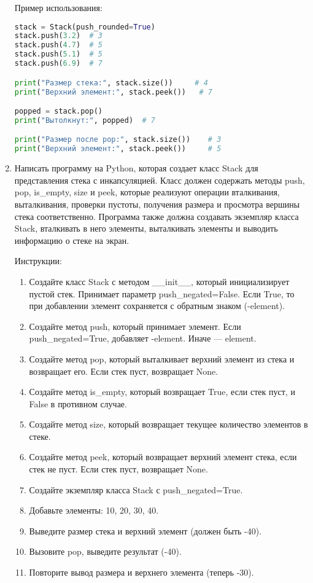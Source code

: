 \begin{enumerate}
Пример использования:
\begin{lstlisting}[language=Python]
stack = Stack(push_rounded=True)
stack.push(3.2)  # 3
stack.push(4.7)  # 5
stack.push(5.1)  # 5
stack.push(6.9)  # 7

print("Размер стека:", stack.size())     # 4
print("Верхний элемент:", stack.peek())   # 7

popped = stack.pop()
print("Вытолкнут:", popped)  # 7

print("Размер после pop:", stack.size())    # 3
print("Верхний элемент:", stack.peek())     # 5
\end{lstlisting}

\item Написать программу на Python, которая создает класс Stack для представления стека с инкапсуляцией. Класс должен содержать методы push, pop, is\_empty, size и peek, которые реализуют операции вталкивания, выталкивания, проверки пустоты, получения размера и просмотра вершины стека соответственно. Программа также должна создавать экземпляр класса Stack, вталкивать в него элементы, выталкивать элементы и выводить информацию о стеке на экран.

Инструкции:
\begin{enumerate}
    \item Создайте класс Stack с методом \_\_init\_\_, который инициализирует пустой стек. Принимает параметр push\_negated=False. Если True, то при добавлении элемент сохраняется с обратным знаком (-element).
    \item Создайте метод push, который принимает элемент. Если push\_negated=True, добавляет -element. Иначе — element.
    \item Создайте метод pop, который выталкивает верхний элемент из стека и возвращает его. Если стек пуст, возвращает None.
    \item Создайте метод is\_empty, который возвращает True, если стек пуст, и False в противном случае.
    \item Создайте метод size, который возвращает текущее количество элементов в стеке.
    \item Создайте метод peek, который возвращает верхний элемент стека, если стек не пуст. Если стек пуст, возвращает None.
    \item Создайте экземпляр класса Stack с push\_negated=True.
    \item Добавьте элементы: 10, 20, 30, 40.
    \item Выведите размер стека и верхний элемент (должен быть -40).
    \item Вызовите pop, выведите результат (-40).
    \item Повторите вывод размера и верхнего элемента (теперь -30).
\end{enumerate}


\end{enumerate}
